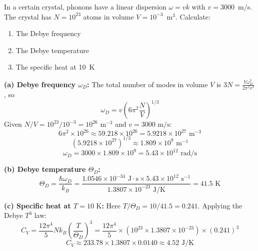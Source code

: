 \documentclass[11pt,a4paper]{article}
\begin{document}
\begin{probbox}[Problem 4]
In a certain crystal, phonons have a linear dispersion $\omega=vk$ with
$v=3000$~m/s. The crystal has $N=10^{23}$ atoms in volume $V=10^{-3}$~m$^3$.
Calculate:
\begin{enumerate}[label=(\alph*)]
\item The Debye frequency
\item The Debye temperature
\item The specific heat at 10~K
\end{enumerate}
\end{probbox}
\begin{solbox}
\textbf{(a) Debye frequency $\omega_D$:}
The total number of modes in volume $V$ is $3N = \frac{V\omega_D^3}{2\pi^2 v^3}$, so
\[
\omega_D = v\left(6\pi^2 \frac{N}{V}\right)^{1/3}
\]
Given $N/V = 10^{23} / 10^{-3} = 10^{26}\text{ m}^{-3}$ and $v = 3000\text{ m/s}$:
\[
6\pi^2 \times 10^{26} \approx 59.218 \times 10^{26} = 5.9218 \times 10^{27}\text{ m}^{-3}
\]
\[
\left(5.9218 \times 10^{27}\right)^{1/3} \approx 1.809 \times 10^9\text{ m}^{-1}
\]
\[
\omega_D = 3000 \times 1.809 \times 10^9 = 5.43 \times 10^{12}\text{ rad/s}
\]

\textbf{(b) Debye temperature $\Theta_D$:}
\[
\Theta_D = \frac{\hbar\omega_D}{k_B} = \frac{1.0546 \times 10^{-34}\text{ J}\cdot\text{s} \times 5.43 \times 10^{12}\text{ s}^{-1}}{1.3807 \times 10^{-23}\text{ J/K}} = 41.5\text{ K}
\]

\textbf{(c) Specific heat at $T = 10\text{ K}$:}
Here $T/\Theta_D = 10 / 41.5 = 0.241$. Applying the Debye $T^3$ law:
\[
C_V = \frac{12\pi^4}{5} N k_B \left(\frac{T}{\Theta_D}\right)^3 = \frac{12\pi^4}{5} \times (10^{23} \times 1.3807 \times 10^{-23}) \times (0.241)^3
\]
\[
C_V \approx 233.78 \times 1.3807 \times 0.0140 \approx 4.52\text{ J/K}
\]
\end{solbox}
\end{document}
